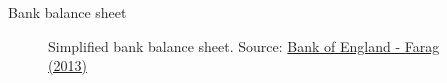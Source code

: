 \begin{frame}{Bank balance sheet}

\begin{figure}
\begin{center}


\caption{\label{fig:L4_simplified_bs} Simplified bank balance sheet. Source: \href{https://www.bankofengland.co.uk/-/media/boe/files/quarterly-bulletin/2013/bank-capital-and-liquidity.pdf}{Bank of England - Farag (2013)}}

\end{center}
\end{figure}

\end{frame}



